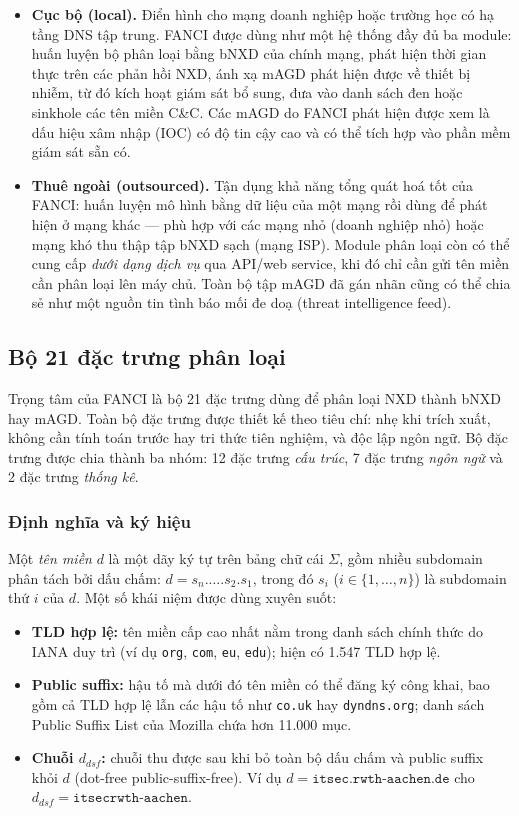 \begin{itemize}
  \item \textbf{Cục bộ (local).} Điển hình cho mạng doanh nghiệp hoặc trường học có hạ tầng DNS tập trung. FANCI được dùng như một hệ thống đầy đủ ba module: huấn luyện bộ phân loại bằng bNXD của chính mạng, phát hiện thời gian thực trên các phản hồi NXD, ánh xạ mAGD phát hiện được về thiết bị nhiễm, từ đó kích hoạt giám sát bổ sung, đưa vào danh sách đen hoặc sinkhole các tên miền C\&C. Các mAGD do FANCI phát hiện được xem là dấu hiệu xâm nhập (IOC) có độ tin cậy cao và có thể tích hợp vào phần mềm giám sát sẵn có.
  \item \textbf{Thuê ngoài (outsourced).} Tận dụng khả năng tổng quát hoá tốt của FANCI: huấn luyện mô hình bằng dữ liệu của một mạng rồi dùng để phát hiện ở mạng khác --- phù hợp với các mạng nhỏ (doanh nghiệp nhỏ) hoặc mạng khó thu thập tập bNXD sạch (mạng ISP). Module phân loại còn có thể cung cấp \textit{dưới dạng dịch vụ} qua API/web service, khi đó chỉ cần gửi tên miền cần phân loại lên máy chủ. Toàn bộ tập mAGD đã gán nhãn cũng có thể chia sẻ như một nguồn tin tình báo mối đe doạ (threat intelligence feed).
\end{itemize}

\subsection{Bộ 21 đặc trưng phân loại}\label{sec:dac-trung}

Trọng tâm của FANCI là bộ 21 đặc trưng dùng để phân loại NXD thành bNXD hay mAGD. Toàn bộ đặc trưng được thiết kế theo tiêu chí: nhẹ khi trích xuất, không cần tính toán trước hay tri thức tiên nghiệm, và độc lập ngôn ngữ. Bộ đặc trưng được chia thành ba nhóm: 12 đặc trưng \textit{cấu trúc}, 7 đặc trưng \textit{ngôn ngữ} và 2 đặc trưng \textit{thống kê}.

\subsubsection{Định nghĩa và ký hiệu}

Một \textit{tên miền} $d$ là một dãy ký tự trên bảng chữ cái $\Sigma$, gồm nhiều subdomain phân tách bởi dấu chấm: $d = s_n.\ldots.s_2.s_1$, trong đó $s_i$ ($i \in \{1,\ldots,n\}$) là subdomain thứ $i$ của $d$. Một số khái niệm được dùng xuyên suốt:

\begin{itemize}
  \item \textbf{TLD hợp lệ:} tên miền cấp cao nhất nằm trong danh sách chính thức do IANA duy trì (ví dụ \texttt{org}, \texttt{com}, \texttt{eu}, \texttt{edu}); hiện có 1.547 TLD hợp lệ.
  \item \textbf{Public suffix:} hậu tố mà dưới đó tên miền có thể đăng ký công khai, bao gồm cả TLD hợp lệ lẫn các hậu tố như \texttt{co.uk} hay \texttt{dyndns.org}; danh sách Public Suffix List của Mozilla \cite{publicsuffix} chứa hơn 11.000 mục.
  \item \textbf{Chuỗi $d_{dsf}$:} chuỗi thu được sau khi bỏ toàn bộ dấu chấm và public suffix khỏi $d$ (dot-free public-suffix-free). Ví dụ $d = \texttt{itsec.rwth-aachen.de}$ cho $d_{dsf} = \texttt{itsecrwth-aachen}$.
\end{itemize}

